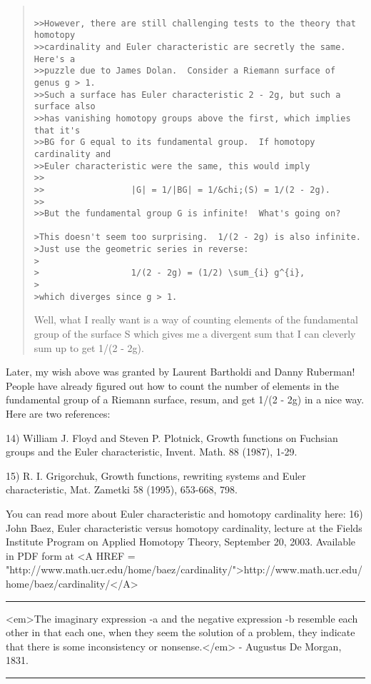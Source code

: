 \begin{quote}
\begin{verbatim}

>>However, there are still challenging tests to the theory that homotopy
>>cardinality and Euler characteristic are secretly the same.  Here's a
>>puzzle due to James Dolan.  Consider a Riemann surface of genus g > 1.
>>Such a surface has Euler characteristic 2 - 2g, but such a surface also
>>has vanishing homotopy groups above the first, which implies that it's
>>BG for G equal to its fundamental group.  If homotopy cardinality and
>>Euler characteristic were the same, this would imply
>>
>>                 |G| = 1/|BG| = 1/&chi;(S) = 1/(2 - 2g).
>>
>>But the fundamental group G is infinite!  What's going on?  

>This doesn't seem too surprising.  1/(2 - 2g) is also infinite.
>Just use the geometric series in reverse:
>
>                  1/(2 - 2g) = (1/2) \sum_{i} g^{i}, 
>
>which diverges since g > 1.
\end{verbatim}
    

Well, what I really want is a way of counting elements of the fundamental
group of the surface S which gives me a divergent sum that I can cleverly
sum up to get 1/(2 - 2g).  

\end{quote}

Later, my wish above was granted by Laurent Bartholdi and Danny Ruberman!
People have already figured out how to count the number of elements
in the fundamental group of a Riemann surface, resum, and get 1/(2 - 2g) 
in a nice way.  Here are two references:

14) William J. Floyd and Steven P. Plotnick, Growth functions on 
Fuchsian groups and the Euler characteristic, Invent. Math. 88
(1987), 1-29.

15) R. I. Grigorchuk, Growth functions, rewriting systems and Euler 
characteristic, Mat. Zametki 58 (1995), 653-668, 798.

You can read more about Euler characteristic and homotopy cardinality
here:
16) John Baez, Euler characteristic versus homotopy cardinality, 
lecture at the Fields Institute Program on Applied Homotopy Theory, 
September 20, 2003.  Available in PDF form at <A HREF = "http://www.math.ucr.edu/home/baez/cardinality/">http://www.math.ucr.edu/home/baez/cardinality/</A>






 \par\noindent\rule{\textwidth}{0.4pt}

<em>The imaginary expression \sqrt -a and the negative expression
-b resemble each other in that each one, when they seem the solution
of a problem, they indicate that there is some inconsistency or
nonsense.</em> - Augustus De Morgan, 1831.
\par\noindent\rule{\textwidth}{0.4pt}

